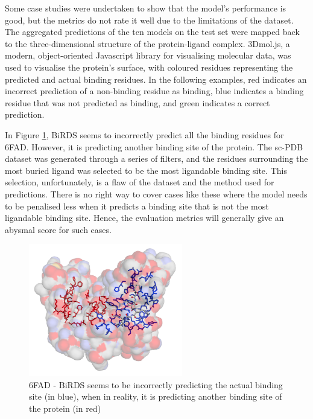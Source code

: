 \documentclass[journal=jcisd8,manuscript=article]{achemso}
\begin{document}
\quad Some case studies were undertaken to show that the model's performance is good, but the metrics do not rate it well due to the limitations of the dataset. The aggregated predictions of the ten models on the test set were mapped back to the three-dimensional structure of the protein-ligand complex. 3Dmol.js\cite{rego20153dmol}, a modern, object-oriented Javascript library for visualising molecular data, was used to visualise the protein's surface, with coloured residues representing the predicted and actual binding residues. In the following examples, red indicates an incorrect prediction of a non-binding residue as binding, blue indicates a binding residue that was not predicted as binding, and green indicates a correct prediction.

\newpage
In Figure \ref{fig:6fad}, BiRDS seems to incorrectly predict all the binding residues for 6FAD\cite{tunnicliffe2019molecular}. However, it is predicting another binding site of the protein. The sc-PDB\cite{desaphy2015sc} dataset was generated through a series of filters, and the residues surrounding the most buried ligand was selected to be the most ligandable binding site. This selection, unfortunately, is a flaw of the dataset and the method used for predictions. There is no right way to cover cases like these where the model needs to be penalised less when it predicts a binding site that is not the most ligandable binding site. Hence, the evaluation metrics will generally give an abysmal score for such cases.
\begin{figure}
    \centering
    \noindent\includegraphics[width=0.6\textwidth]{6fad.png}
    \caption{\centering 6FAD - BiRDS seems to be incorrectly predicting the actual binding site (in blue), when in reality, it is predicting another binding site of the protein (in red)}
    \label{fig:6fad}
\end{figure}
\end{document}
